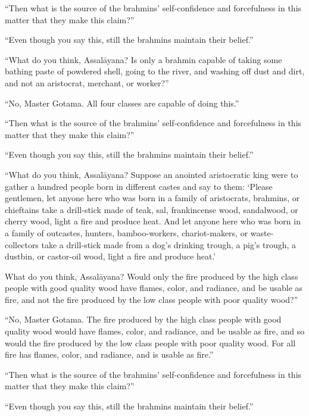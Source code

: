 \documentclass[12pt,openany]{book}%
\begin{document}
“Then what is the source of the brahmins’ self-confidence and forcefulness in this matter that they make this claim?” 

“Even though you say this, still the brahmins maintain their belief.” 

“What do you think, \textsanskrit{Assalāyana}? Is only a brahmin capable of taking some bathing paste of powdered shell, going to the river, and washing off dust and dirt, and not an aristocrat, merchant, or worker?” 

“No, Master Gotama. All four classes are capable of doing this.” 

“Then what is the source of the brahmins’ self-confidence and forcefulness in this matter that they make this claim?” 

“Even though you say this, still the brahmins maintain their belief.” 

“What do you think, \textsanskrit{Assalāyana}? Suppose an anointed aristocratic king were to gather a hundred people born in different castes and say to them: ‘Please gentlemen, let anyone here who was born in a family of aristocrats, brahmins, or chieftains take a drill-stick made of teak, sal, frankincense wood, sandalwood, or cherry wood, light a fire and produce heat. And let anyone here who was born in a family of outcastes, hunters, bamboo-workers, chariot-makers, or waste-collectors take a drill-stick made from a dog’s drinking trough, a pig’s trough, a dustbin, or castor-oil wood, light a fire and produce heat.’ 

What do you think, \textsanskrit{Assalāyana}? Would only the fire produced by the high class people with good quality wood have flames, color, and radiance, and be usable as fire, and not the fire produced by the low class people with poor quality wood?” 

“No, Master Gotama. The fire produced by the high class people with good quality wood would have flames, color, and radiance, and be usable as fire, and so would the fire produced by the low class people with poor quality wood. For all fire has flames, color, and radiance, and is usable as fire.” 

“Then what is the source of the brahmins’ self-confidence and forcefulness in this matter that they make this claim?” 

“Even though you say this, still the brahmins maintain their belief.” 
\end{document}

